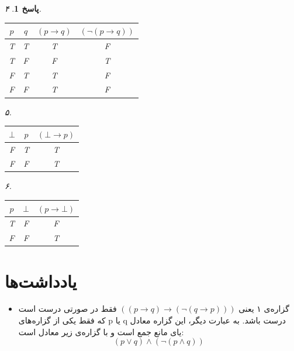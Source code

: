 \documentclass[a4paper,12pt]{article}
\theoremstyle{exercise}
\newtheorem{solution}{پاسخ}
\begin{document}
\begin{solution}
		\noindent
		۴.
		\begin{latin}
			\begin{table}[H]
				\centering
				\begin{tabular}{c|c|c|c}
					$p$ & $q$ & $(p \rightarrow q)$ & $(\neg (p \rightarrow q))$ \\
					\hline
					T & T & T & F \\
					T & F & F & T \\
					F & T & T & F \\
					F & F & T & F \\
				\end{tabular}
			\end{table}
		\end{latin}
		
		\noindent
		۵.
		\begin{latin}
			\begin{table}[H]
				\centering
				\begin{tabular}{c|c|c}
					$\bot$ & $p$ & $(\bot \rightarrow p)$ \\
					\hline
					F & T & T \\
					F & F & T
				\end{tabular}
			\end{table}
		\end{latin}
		
		\noindent
		۶.
		\begin{latin}
			\begin{table}[H]
				\centering
				\begin{tabular}{c|c|c}
					$p$ & $\bot$ & $(p \rightarrow \bot)$ \\
					\hline
					T & F & F \\
					F & F & T
				\end{tabular}
			\end{table}
		\end{latin}
	\end{solution}
	
	\section*{یادداشت‌ها}
	\begin{itemize}
		\item گزاره‌ی ۱ یعنی $((p \rightarrow q) \rightarrow (\neg(q \rightarrow p)))$ فقط در صورتی درست است که فقط یکی از گزاره‌های p یا q درست باشد. به عبارت دیگر، این گزاره معادل یای مانع جمع است و با گزاره‌ی زیر معادل است:
		$$ (p \vee q) \wedge (\neg (p \wedge q)) $$
	\end{itemize}
	
\end{document}
